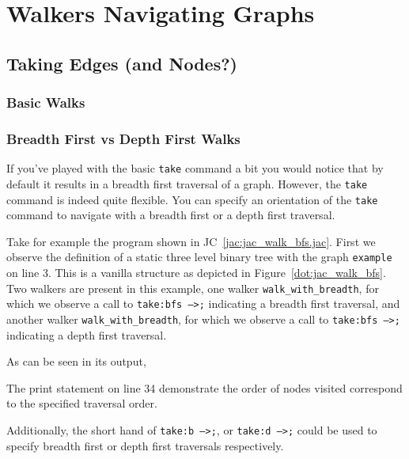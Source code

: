 \chapter{Walkers Navigating Graphs}



\section{Taking Edges (and Nodes?)}

\subsection{Basic Walks}

\par
{}

\par
{}

\subsection{Breadth First vs Depth First Walks}
\par
{}
If you've played with the basic \texttt{take} command a bit you would notice that by default it results in a breadth first traversal of a graph.
However, the \texttt{take} command is indeed quite flexible.
You can specify an orientation of the \texttt{take} command to navigate with a breadth first or a depth first traversal.
\par
{}
\par
Take for example the program shown in JC~\ref{jac:jac_walk_bfs.jac}.
First we observe the definition of a static three level binary tree with the graph \texttt{example} on line 3.
This is a vanilla structure as depicted in Figure~\ref{dot:jac_walk_bfs}.
Two walkers are present in this example, one walker \texttt{walk\_with\_breadth}, for which we observe a call to \texttt{take:bfs -->;} indicating a breadth first traversal, and another walker \texttt{walk\_with\_breadth}, for which we observe a call to \texttt{take:bfs -->;} indicating a depth first traversal.
\par
As can be seen in its output,
\par
{}
The print statement on line 34 demonstrate the order of nodes visited correspond to the specified traversal order.
\par
Additionally, the short hand of \texttt{take:b -->;}, or \texttt{take:d -->;} could be used to specify breadth first or depth first traversals respectively.



